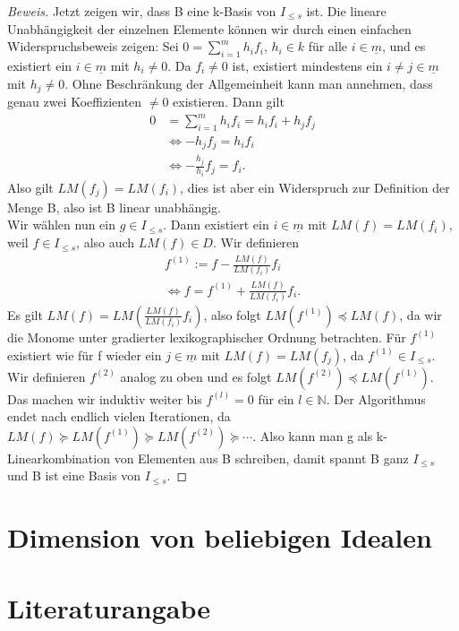\documentclass{article}
\newcommand*{\I}{I_{\leq s}}
\begin{document}
\begin{proof}[Beweis]
	Jetzt zeigen wir, dass B eine k-Basis von \(\I\) ist. Die lineare Unabhängigkeit der einzelnen 
	Elemente können wir durch einen einfachen Widerspruchsbeweis zeigen:
	Sei \(0 = \sum_{i=1}^{m} h_{i}f_{i}\), \(h_{i} \in k\) für alle \(i \in \underline{m}\),
	und es existiert ein \(i \in \underline{m}\) mit \(h_{i} \neq 0\).
	Da \(f_{i} \neq 0\) ist, existiert mindestens ein \(i \neq j \in \underline
	{m}\) mit \(h_{j} \neq 0\). Ohne Beschränkung der Allgemeinheit kann man annehmen, dass genau
	zwei Koeffizienten \(\neq 0\) existieren. Dann gilt
	\begin{align*}
		0 &= \sum_{i=1}^{m} h_{i}f_{i} = h_{i}f_{i} + h_{j}f_{j} \\
		&\Leftrightarrow -h_{j}f_{j} = h_{i}f_{i} \\
		&\Leftrightarrow -\frac{h_{j}}{h_{i}} f_{j} = f_{i}.
	\end{align*}
	Also gilt \(LM(f_{j}) = LM(f_{i})\), dies ist aber ein Widerspruch zur Definition der Menge B,
	also ist B linear unabhängig. \\
	Wir wählen nun ein \(g \in \I\). Dann existiert ein \(i \in \underline{m}\) mit \(LM(f) =
	LM(f_{i})\), weil \(f \in \I\), also auch \(LM(f) \in D\). Wir definieren
	\begin{align*}
		f^{(1)} := f - \frac{LM(f)}{LM(f_{i})}f_{i} \\
		\Leftrightarrow f = f^{(1)} + \frac{LM(f)}{LM(f_{i})}f_{i}.
	\end{align*}
	Es gilt \(LM(f) = LM(\frac{LM(f)}{LM(f_{i})}f_{i})\), also folgt \(LM(f^{(1)}) \preceq LM(f)\),
	da wir die Monome unter gradierter lexikographischer Ordnung betrachten.
	Für \(f^{(1)}\) existiert wie für f wieder ein \(j \in \underline{m}\) mit \(LM(f) =
	LM(f_{j})\), da \(f^{(1)} \in \I\). Wir definieren \(f^{(2)}\) analog zu oben und es
	folgt \(LM(f^{(2)}) \preceq LM(f^{(1)})\). Das machen wir induktiv weiter bis \(f^{(l)} = 0\)  
	für ein \(l \in \mathbb{N}\).
	Der Algorithmus endet nach endlich vielen Iterationen, da \(LM(f) \succeq LM(f^{(1)}) \succeq LM(f^{(2)}) \succeq \cdots\).
	Also kann man g als k-Linearkombination von Elementen aus B schreiben, damit spannt B ganz \(\I\) und B ist eine Basis von \(\I\).
	\end{proof}
	
	
\section{Dimension von beliebigen Idealen}
\section{Literaturangabe}
\end{document}
